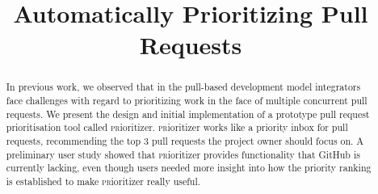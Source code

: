 \documentclass[conference]{IEEEtran}
\begin{document}
\newcommand{\ghtorrent}{\textsc{ght}orrent\xspace}
\newcommand{\prioritizer}{\textsc{pr}ioritizer\xspace}
\newcommand{\api}{\textsc{api}\xspace}
\newcommand{\todo}[1]{\textcolor{red}{\textbf{\textsc{todo:}} #1}}

\newcommand{\nb}[3]{
  \fcolorbox{black}{#2}{\bfseries\sffamily\scriptsize#1}
    {\sf\small$\blacktriangleright$\textit{#3}$\blacktriangleleft$}
}

\newcommand\georgios[1]{\nb{Georgios}{yellow}{#1}}
\newcommand\andy[1]{\nb{Andy}{cyan}{#1}}
\newcommand\erik[1]{\nb{Erik}{magenta}{#1}}

\newcommand{\hassanbox}[1]
{
  \vspace{0.29em}
  \noindent
  \fbox{
  \begin{minipage}{0.46\textwidth}
    \emph{\noindent #1}
    \end{minipage}
}}

\newcommand{\resp}[2]{{\sc R#1:} ``\emph{#2}''}
\newcommand{\respnum}[1]{{\sc R#1}}
\newcommand{\code}[1]{{\textsl{#1}}}

\title{Automatically Prioritizing Pull Requests}

\author{
}


\author{
\and
{}
\and
{}
}

\maketitle

\begin{abstract}

In previous work, we observed that in the pull-based development model integrators face challenges with regard to prioritizing work in the face of multiple concurrent pull requests. We present the design and initial implementation of a prototype pull request prioritisation tool called \prioritizer. \prioritizer works like a priority inbox for pull requests, recommending the top 3 pull requests the project owner should focus on. A preliminary user study showed that \prioritizer provides functionality that GitHub is currently lacking, even though users needed more insight into how the priority ranking is established to make \prioritizer really useful.

\end{abstract}
\end{document}
